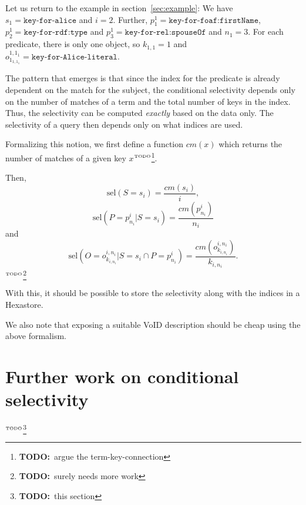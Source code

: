 \documentclass[12pt, draft]{article}
\newcommand{\todo}[1]{\ensuremath{^{\textrm{\tiny{TODO}\normalsize}}}\footnote{\textbf{TODO:}~#1}}
\newcommand{\sel}[1]{\ensuremath{\mathrm{sel}\left(#1\right)}}
\begin{document}
Let us return to the example in section~\ref{sec:example}: We have
$s_1 = \texttt{key-for-alice}$ and $i=2$. Further, $p_1^1 =
\texttt{key-for-foaf:firstName}$, $p_2^1 = \texttt{key-for-rdf:type}$ and $p_3^1 =
\texttt{key-for-rel:spouseOf}$ and $n_1 = 3$. For each predicate, there is only
one object, so $k_{1,1} = 1$ and $o_{1_{1,1_1}}^{1,1_1} = \texttt{key-for-Alice-literal}$.

The pattern that emerges is that since the index for the predicate is
already dependent on the match for the subject, the conditional
selectivity depends only on the number of matches of a term and the
total number of keys in the index. Thus, the selectivity can be
computed \emph{exactly} based on the data only. The selectivity of a
query then depends only on what indices are used. 

Formalizing this notion, we first define a function $cm(x)$ which
returns the number of matches of a given key $x$\todo{argue the
  term-key-connection}. 

Then, 
\begin{equation}
\sel{S = s_i} = \frac{cm(s_i)}{i} ,
\end{equation}
\begin{equation}
\sel{P = p_{n_i}^i|S = s_i} = \frac{cm(p_{n_i}^i)}{n_i}
\end{equation}
and
\begin{equation}
\sel{O = o_{k_{i,n_i}}^{i,n_i} |S = s_i \cap P = p_{n_i}^i} =
\frac{cm(o_{k_{i,n_i}}^{i,n_i})}{k_{i,n_i}} .
\end{equation}
\todo{surely needs more work}

With this, it should be possible to store the selectivity along with
the indices in a Hexastore.

We also note that exposing a suitable VoID description should be cheap
using the above formalism.

\section{Further work on conditional selectivity}

\todo{this section}



\end{document}
